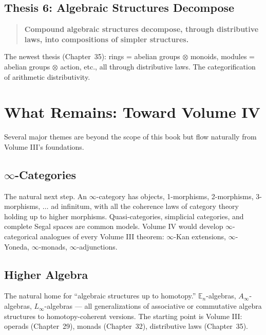 \subsection{Thesis 6: Algebraic Structures Decompose}

\begin{quote}
\textbf{Compound algebraic structures decompose, through distributive laws,
into compositions of simpler structures.}
\end{quote}

\noindent The newest thesis (Chapter~35): rings = abelian groups
$\otimes$ monoids, modules = abelian groups $\otimes$ action, etc., all
through distributive laws. The categorification of arithmetic
distributivity.


\section{What Remains: Toward Volume IV}
\label{sec:beyond-vol3}

Several major themes are beyond the scope of this book but flow naturally
from Volume III's foundations.

\subsection{$\infty$-Categories}

The natural next step. An $\infty$-category has objects, 1-morphisms,
2-morphisms, 3-morphisms, $\ldots$ ad infinitum, with all the coherence
laws of category theory holding up to higher morphisms. Quasi-categories,
simplicial categories, and complete Segal spaces are common models.
Volume IV would develop $\infty$-categorical analogues of every Volume
III theorem: $\infty$-Kan extensions, $\infty$-Yoneda, $\infty$-monads,
$\infty$-adjunctions.

\subsection{Higher Algebra}

The natural home for ``algebraic structures up to homotopy.''
$\mathbb{E}_n$-algebras, $A_\infty$-algebras, $L_\infty$-algebras — all
generalizations of associative or commutative algebra structures to
homotopy-coherent versions. The starting point is Volume III: operads
(Chapter~29), monads (Chapter~32), distributive laws (Chapter~35).

